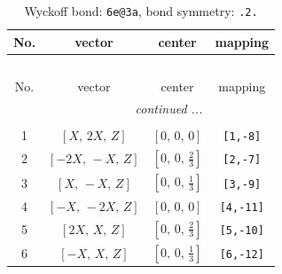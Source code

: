\documentclass[fleqn,8pt]{jsarticle}
\begin{document}
\renewcommand{\arraystretch}{1.2}
\begin{longtable}{cccc}
\caption{Wyckoff bond: {\tt 6e@3a}, bond symmetry: {\tt .2.}}
 \\
 \hline \hline
No. & vector & center & mapping \\ \hline \endfirsthead

\multicolumn{3}{l}{\tablename\ \thetable{}} \\
 \hline \hline
No. & vector & center & mapping \\ \hline \endhead

 \hline \hline
\multicolumn{3}{r}{\footnotesize\it continued ...} \\ \endfoot

 \hline \hline
\multicolumn{3}{r}{} \\ \endlastfoot

1 & $\left[ X,\, 2 X,\, Z \right]$ & $\left[ 0,\, 0,\, 0 \right]$ & {\tt [1,-8]} \\ \hline
2 & $\left[ - 2 X,\, - X,\, Z \right]$ & $\left[ 0,\, 0,\, \frac{2}{3} \right]$ & {\tt [2,-7]} \\ \hline
3 & $\left[ X,\, - X,\, Z \right]$ & $\left[ 0,\, 0,\, \frac{1}{3} \right]$ & {\tt [3,-9]} \\ \hline
4 & $\left[ - X,\, - 2 X,\, Z \right]$ & $\left[ 0,\, 0,\, 0 \right]$ & {\tt [4,-11]} \\ \hline
5 & $\left[ 2 X,\, X,\, Z \right]$ & $\left[ 0,\, 0,\, \frac{2}{3} \right]$ & {\tt [5,-10]} \\ \hline
6 & $\left[ - X,\, X,\, Z \right]$ & $\left[ 0,\, 0,\, \frac{1}{3} \right]$ & {\tt [6,-12]} \\
\end{longtable}
\renewcommand{\arraystretch}{1.2}
\end{document}
